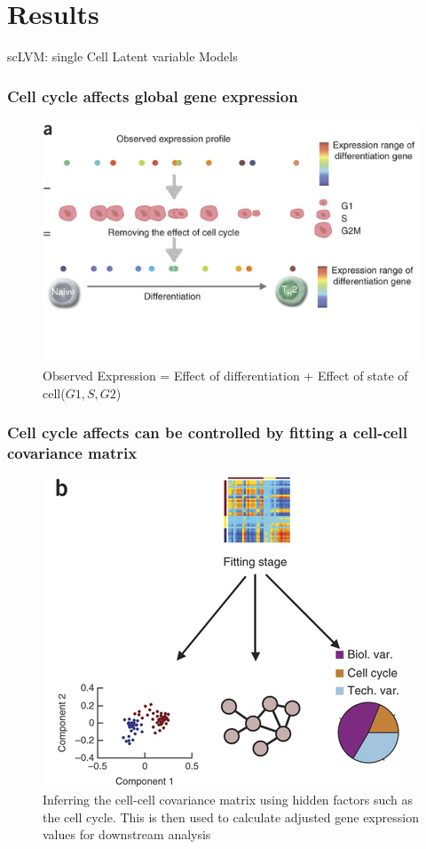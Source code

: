 \documentclass[10pt, compress]{beamer}
\renewcommand{\(}{\begin{columns}}
\renewcommand{\)}{\end{columns}}
\newcommand{\<}[1]{\begin{column}{#1}}
\renewcommand{\>}{\end{column}}
\begin{document}
\section{Results}
scLVM: single Cell Latent variable Models
\begin{frame}
\frametitle{Cell cycle affects global gene expression}
\begin{figure}
\includegraphics[width=0.8\linewidth]{images/expression.jpg}
\caption{Observed Expression = Effect of differentiation + Effect of state of cell($G1,  S , G2$)}
\end{figure}
\end{frame}

\begin{frame}
\frametitle{Cell cycle affects can be controlled by fitting a cell-cell covariance matrix}
\begin{figure}
\includegraphics[width=0.5\linewidth]{images/fitting.jpg}
\caption{Inferring the cell-cell covariance matrix using hidden factors such as the cell cycle. This is then used to calculate adjusted
gene expression values for downstream analysis}
\end{figure}
\end{frame}
\end{document}
